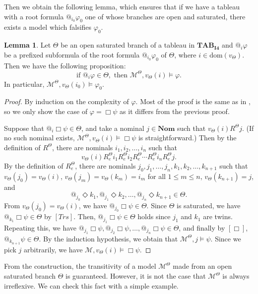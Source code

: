 \documentclass{article}
\theoremstyle{definition}
\newtheorem{lemma}[definition]{Lemma}
\newcommand{\Nom}{\mathbf{Nom}}
\newcommand{\Dia}{\Diamond}
\newcommand{\Kmodel}{\mathcal{M}}
\newcommand{\trans}{\mathit{Trs}}
\newcommand{\dom}{\mathrm{dom}}
\newcommand{\tableauIF}{\mathbf{TAB}_{\mathbf{I4}}}
\begin{document}
Then we obtain the following lemma, which ensures that if we have a tableau with a root formula $@_{i_0} \varphi_0$ one of whose branches are open and saturated, there exists a model which falsifies $\varphi_0$.

\begin{lemma}
    Let $\Theta$ be an open saturated branch of a tableau in $\tableauIF$ and $@_i \varphi$ be a prefixed subformula of the root formula $@_{i_0} \varphi_0$ of $\Theta$, where $i \in \dom(v_\Theta)$. Then we have the following proposition:
    \[
        \text{if } @_i \varphi \in \Theta, \text{ then } \Kmodel^\Theta, v_\Theta(i) \models \varphi.
    \]
    In particular, $\Kmodel^\Theta, v_\Theta(i_0) \models \varphi_0$.
    \label{lemmodelexistI4}
\end{lemma}
\begin{proof}
    By induction on the complexity of $\varphi$. Most of the proof is the same as in \cite{nishimura2025}, so we only show the case of $\varphi = \Box \psi$ as it differs from the previous proof.

    Suppose that $@_i \Box \psi \in \Theta$, and take a nominal $j \in \Nom$ such that $v_\Theta(i) R^\Theta j$. (If no such nominal exists, $\Kmodel^\Theta, v_\Theta(i) \models \Box \psi$ is straightforward.) Then by the definition of $R^\Theta$, there are nominals $i_1, i_2, \ldots, i_n$ such that 
    \[
        v_\Theta(i) R_e^\Theta i_1 R_e^\Theta i_2 R_e^\Theta \cdots R_e^\Theta i_n R_e^\Theta j . 
    \]
    By the definition of $R_e^\Theta$, there are nominals $j_0, j_1, \ldots, j_n, k_1, k_2, \ldots, k_{n+1}$ such that $v_\Theta(j_0) = v_\Theta(i)$, $v_\Theta(j_m) = v_\Theta(k_m) = i_m$ for all $1 \leq m \leq n$, $v_\Theta(k_{n+1}) = j$, and 
    \[
        @_{j_0} \Dia k_1, @_{j_1} \Dia k_2, \ldots, @_{j_n} \Dia k_{n+1} \in \Theta .
    \]
    From $v_\Theta(j_0) = v_\Theta(i)$, we have $@_{j_0} \Box \psi \in \Theta$. Since $\Theta$ is saturated, we have $@_{k_1} \Box \psi \in \Theta$ by $[\trans]$. Then, $@_{j_1} \Box \psi \in \Theta$ holds since $j_1$ and $k_1$ are twins.
    Repeating this, we have $@_{j_1} \Box \psi, @_{j_2} \Box \psi, \ldots, @_{j_n} \Box \psi \in \Theta$, and finally by $[\Box]$, $@_{k_{n+1}} \psi \in \Theta$. By the induction hypothesis, we obtain that $\Kmodel^\Theta, j \models \psi$. Since we pick $j$ arbitrarily, we have $\Kmodel, v_\Theta(i) \models \Box \psi$.
\end{proof}

From the construction, the transitivity of a model $\Kmodel^\Theta$ made from an open saturated branch $\Theta$ is guaranteed. However, it is not the case that $\Kmodel^\Theta$ is always irreflexive. We can check this fact with a simple example.
\end{document}
